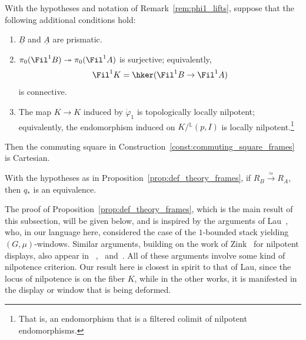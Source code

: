 \documentclass[10pt]{amsart}
\begin{document}
\begin{proposition}
\label{prop:def_theory_frames}
With the hypotheses and notation of Remark~\ref{rem:phi1_lifts}, suppose that the following additional conditions hold:
\begin{enumerate}
   \item $\underline{B}$ and $\underline{A}$ are prismatic.
   \item $\pi_0(\Fil^1 B)\twoheadrightarrow \pi_0(\Fil^1 A)$ is surjective; equivalently,
   \[
\Fil^1K = \hker(\Fil^1B\to \Fil^1A)
\]
is connective.

   \item The map $K\to K$ induced by $\dot{\varphi}_1$ is topologically locally nilpotent; equivalently, the endomorphism induced on $K/{}^{\mathbb{L}}(p,I)$ is locally nilpotent.\footnote{That is, an endomorphism that is a filtered colimit of nilpotent endomorphisms.}
\end{enumerate}
Then the commuting square in Construction~\ref{const:commuting_square_frames} is Cartesian.
\end{proposition}


\begin{corollary}
\label{cor:def_theory_frames}
With the hypotheses as in Proposition~\ref{prop:def_theory_frames}, if ${R_B}\xrightarrow{\simeq}{R_A}$, then $q_*$ is an equivalence.
\end{corollary}



\begin{remark}
The proof of Proposition~\ref{prop:def_theory_frames}, which is the main result of this subsection, will be given below, and is inspired by the arguments of Lau~\cite{MR4355476}, who, in our language here, considered the case of the $1$-bounded stack yielding $(G,\mu)$-windows. Similar arguments, building on the work of Zink~\cite{MR1827031} for nilpotent displays, also appear in ~\cite{MR4120808},~\cite{bartling2022mathcalgmudisplayslocalshtuka} and~\cite{hedayatzadeh_partofard}. All of these arguments involve some kind of nilpotence criterion. Our result here is closest in spirit to that of Lau, since the locus of nilpotence is on the fiber $K$, while in the other works, it is manifested in the display or window that is being deformed. 
\end{remark}
\end{document}
